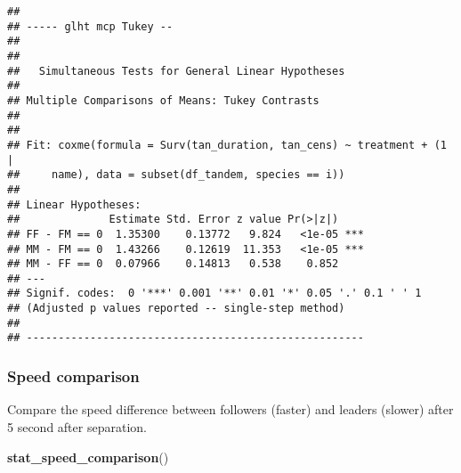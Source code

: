 \documentclass[
]{article}
\newenvironment{Shaded}{\begin{snugshade}}{\end{snugshade}}
\newcommand{\FunctionTok}[1]{\textcolor[rgb]{0.13,0.29,0.53}{\textbf{#1}}}
\newcommand{\NormalTok}[1]{#1}
\begin{document}
\begin{verbatim}
## 
## ----- glht mcp Tukey --
## 
## 
##   Simultaneous Tests for General Linear Hypotheses
## 
## Multiple Comparisons of Means: Tukey Contrasts
## 
## 
## Fit: coxme(formula = Surv(tan_duration, tan_cens) ~ treatment + (1 | 
##     name), data = subset(df_tandem, species == i))
## 
## Linear Hypotheses:
##              Estimate Std. Error z value Pr(>|z|)    
## FF - FM == 0  1.35300    0.13772   9.824   <1e-05 ***
## MM - FM == 0  1.43266    0.12619  11.353   <1e-05 ***
## MM - FF == 0  0.07966    0.14813   0.538    0.852    
## ---
## Signif. codes:  0 '***' 0.001 '**' 0.01 '*' 0.05 '.' 0.1 ' ' 1
## (Adjusted p values reported -- single-step method)
## 
## -----------------------------------------------------
\end{verbatim}

\hypertarget{speed-comparison}{%
\subsubsection{Speed comparison}\label{speed-comparison}}

Compare the speed difference between followers (faster) and leaders
(slower) after 5 second after separation.

\begin{Shaded}
\begin{Highlighting}[]
\FunctionTok{stat\_speed\_comparison}\NormalTok{()}
\end{Highlighting}
\end{Shaded}
\end{document}
